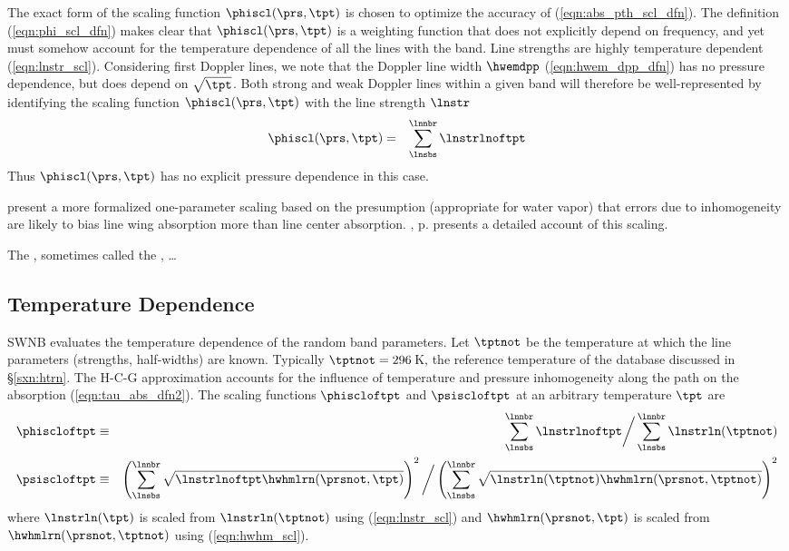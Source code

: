 \documentclass[12pt]{article}
\begin{document}
The exact form of the scaling function $\phiscl(\prs,\tpt)$ is
chosen to optimize the accuracy of (\ref{eqn:abs_pth_scl_dfn}).
The definition (\ref{eqn:phi_scl_dfn}) makes
clear that $\phiscl(\prs,\tpt)$ is a weighting function that does
not explicitly depend on frequency, and yet must somehow account for
the temperature dependence of all the lines with the band.
Line strengths are highly temperature dependent (\ref{eqn:lnstr_scl}).
Considering first Doppler lines, we note that the Doppler line width
$\hwemdpp$ (\ref{eqn:hwem_dpp_dfn}) has no pressure 
dependence, but does depend on $\sqrt{\tpt}$.
Both strong and weak Doppler lines within a given band will therefore 
be well-represented by identifying the scaling function
$\phiscl(\prs,\tpt)$ with the line strength $\lnstr$ 
\begin{eqnarray}
\phiscl(\prs,\tpt) & = & \sum_{\lnsbs}^{\lnnbr} \lnstrlnoftpt
\label{eqn:phi_scl_dpp}
\end{eqnarray}
Thus $\phiscl(\prs,\tpt)$ has no explicit pressure dependence in this
case. 

\cite{ChA80} present a more formalized one-parameter scaling based on
the presumption (appropriate for water vapor) that errors due to
inhomogeneity are likely to bias line wing absorption more than line
center absorption.
\cite{Lio92}, p.  presents a detailed account of this scaling.

The , sometimes called the , \ldots

\subsection[Temperature Dependence]{Temperature Dependence}\label{sxn:tpt}
SWNB evaluates the temperature dependence of the random band
parameters. 
Let $\tptnot$ be the temperature at which the line parameters
(strengths, half-widths) are known.
Typically $\tptnot = 296\,$K, the reference temperature of the
 database discussed in \S\ref{sxn:htrn}.
The H-C-G approximation accounts for the influence of temperature and
pressure inhomogeneity along the path on the absorption
(\ref{eqn:tau_abs_dfn2}). 
The scaling functions $\phiscloftpt$ and $\psiscloftpt$ at an
arbitrary temperature $\tpt$ are
\begin{eqnarray}
\phiscloftpt & \equiv & 
\sum_{\lnsbs}^{\lnnbr} \lnstrlnoftpt \bigg/ 
\sum_{\lnsbs}^{\lnnbr} \lnstrln(\tptnot) \\
\psiscloftpt & \equiv & 
\left( \sum_{\lnsbs}^{\lnnbr} \sqrt{\lnstrlnoftpt
\hwhmlrn(\prsnot,\tpt) } \right)^{2} \bigg/ 
\left( \sum_{\lnsbs}^{\lnnbr} \sqrt{\lnstrln(\tptnot)
\hwhmlrn(\prsnot,\tptnot) } \right)^{2}
\label{eqn:u_bar_dfn}
\end{eqnarray}
where $\lnstrln(\tpt)$ is scaled from $\lnstrln(\tptnot)$ using
(\ref{eqn:lnstr_scl}) 
and $\hwhmlrn(\prsnot,\tpt)$ is scaled from
$\hwhmlrn(\prsnot,\tptnot)$ using (\ref{eqn:hwhm_scl}). 
\end{document}
